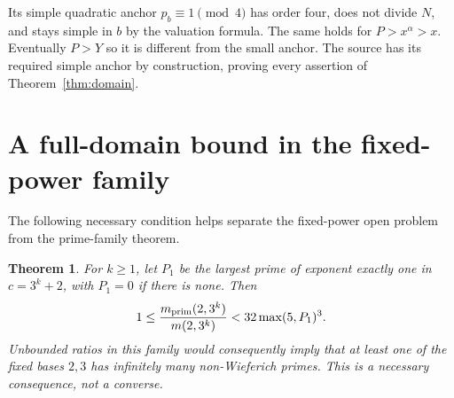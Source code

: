 \documentclass[11pt,a4paper]{article}
\newtheorem{theorem}{Theorem}[section]
\theoremstyle{definition}\newtheorem{question}[theorem]{Question}
\theoremstyle{remark}\newtheorem{remark}[theorem]{Remark}
\begin{document}
Its simple quadratic anchor $p_b\equiv1\pmod4$ has order four,
does not divide $N$, and stays simple in $b$ by the valuation formula.
The same holds for $P>x^\alpha>x$. Eventually $P>Y$ so it is
different from the small anchor. The source has its required simple
anchor by construction, proving every assertion of
Theorem~\ref{thm:domain}.

\section{A full-domain bound in the fixed-power family}\label{app:fixed}
The following necessary condition helps separate the fixed-power open
problem from the prime-family theorem.

\begin{theorem}\label{thm:fixed}
For $k\ge1$, let $P_1$ be the largest prime of exponent exactly one
in $c=3^k+2$, with $P_1=0$ if there is none. Then
\begin{equation}\label{eq:fixed-bound}
 1\le\frac{m_{\mathrm{prim}}(2,3^k)}{m(2,3^k)}<32\max(5,P_1)^3.
\end{equation}
Unbounded ratios in this family would consequently imply that at
least one of the fixed bases $2,3$ has infinitely many non-Wieferich
primes. This is a necessary consequence, not a converse.
\end{theorem}
\end{document}
